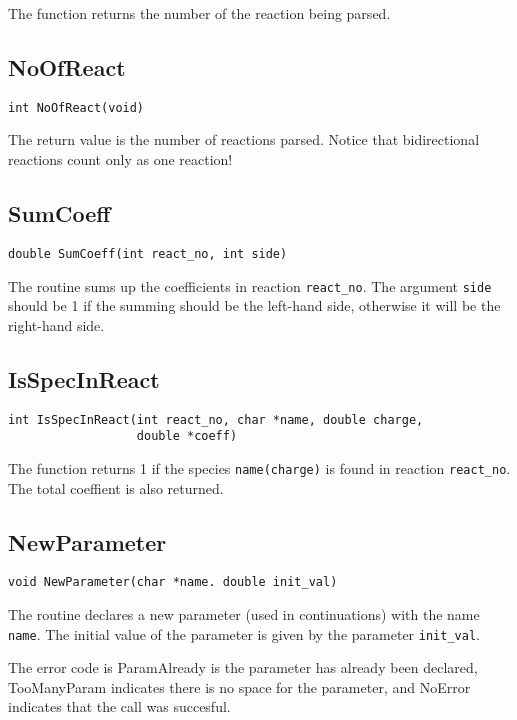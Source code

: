 The function returns the number of the reaction being parsed.

\subsection{NoOfReact}
\begin{verbatim}
int NoOfReact(void)
\end{verbatim}

The return value is the number of reactions parsed. Notice that
bidirectional reactions count only as one reaction!

\subsection{SumCoeff}
\begin{verbatim}
double SumCoeff(int react_no, int side)
\end{verbatim}

The routine sums up the coefficients in reaction {\tt react{\_}no}.
The argument {\tt side} should be 1 if the summing should be the
left-hand side, otherwise it will be the right-hand side.

\subsection{IsSpecInReact}
\begin{verbatim}
int IsSpecInReact(int react_no, char *name, double charge, 
                  double *coeff)
\end{verbatim}

The function returns 1 if the species {\tt name(charge)} is found in
reaction {\tt react{\_}no}. The total coeffient is also returned.

\subsection{NewParameter}
\begin{verbatim}
void NewParameter(char *name. double init_val)
\end{verbatim}

The routine declares a new parameter (used in continuations) with the
name {\tt name}. The initial value of the parameter is given by the
parameter {\tt init{\_}val}.

The error code is ParamAlready is the parameter has already been
declared, TooManyParam indicates there is no space for the parameter,
and NoError indicates that the call was succesful.

